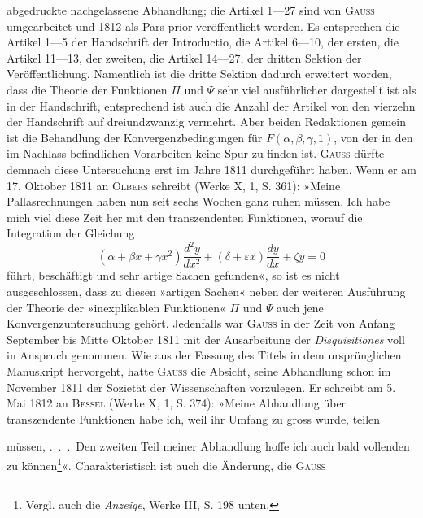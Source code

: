 abgedruckte nachgelassene Abhandlung; die Artikel 1—27 sind von \textsc{Gauss}
umgearbeitet und 1812 als Pars prior veröffentlicht worden. Es entsprechen
die Artikel 1—5 der Handschrift der Introductio, die Artikel 6—10, der ersten,
die Artikel 11—13, der zweiten, die Artikel 14—27, der dritten Sektion der
Veröffentlichung. Namentlich ist die dritte Sektion dadurch erweitert worden,
dass die Theorie der Funktionen \(\Pi\) und \(\Psi\) sehr viel ausführlicher dargestellt
ist als in der Handschrift, entsprechend ist auch die Anzahl der Artikel von
den vierzehn der Handschrift auf dreiundzwanzig vermehrt. Aber beiden Redaktionen
gemein ist die Behandlung der Konvergenzbedingungen für \(F(\alpha,\beta,\gamma,1)\),
von der in den im Nachlass befindlichen Vorarbeiten keine Spur zu finden
ist. \textsc{Gauss} dürfte demnach diese Untersuchung erst im Jahre 1811 durchgeführt
haben. Wenn er am 17. Oktober 1811 an \textsc{Olbers} schreibt (Werke X, 1,
S. 361): »Meine Pallasrechnungen haben nun seit sechs Wochen ganz ruhen
müssen. Ich habe mich viel diese Zeit her mit den transzendenten Funktionen,
worauf die Integration der Gleichung
\begingroup\makeatletter\tagsleft@true\let\veqno\leqno\makeatother
\begin{equation*}
(\alpha+\beta x+\gamma x^2)\frac{d^2y}{dx^2}
+(\delta+\varepsilon x)\frac{dy}{dx}+\zeta y=0\tag{13}
\end{equation*}\endgroup
\noindent führt, beschäftigt und sehr artige Sachen gefunden«, so ist es nicht ausgeschlossen,
dass zu diesen »artigen Sachen« neben der weiteren Ausführung der
Theorie der »inexplikablen Funktionen« \(\Pi\) und \(\Psi\) auch jene Konvergenzuntersuchung
gehört. Jedenfalls war \textsc{Gauss} in der Zeit von Anfang September bis
Mitte Oktober 1811 mit der Ausarbeitung der \textit{Disquisitiones} voll in Anspruch
genommen. Wie aus der Fassung des Titels in dem ursprünglichen Manuskript
hervorgeht, hatte \textsc{Gauss} die Absicht, seine Abhandlung schon im November
1811 der Sozietät der Wissenschaften vorzulegen. Er schreibt am
5. Mai 1812 an \textsc{Bessel} (Werke X, 1, S. 374): »Meine Abhandlung über transzendente
Funktionen habe ich, weil ihr Umfang zu gross wurde, teilen\par
\clearpage{}
\noindent müssen, \mbox{.\ .\ .}\ Den zweiten Teil meiner Abhandlung hoffe ich auch bald
vollenden zu können\footnote{Vergl. auch die \textit{Anzeige}, Werke III, S. 198 unten.}«. Charakteristisch ist auch die Änderung, die \textsc{Gauss}
